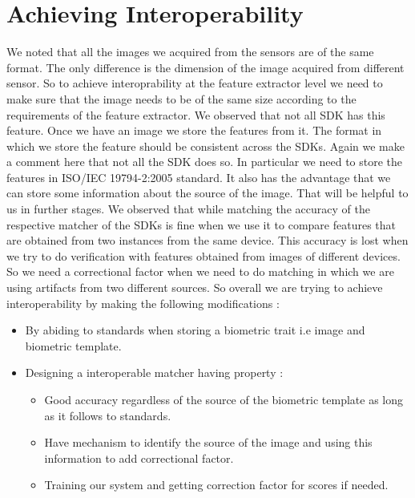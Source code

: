 \documentclass{article}
\begin{document}
\section*{Achieving Interoperability}
We noted that all the images we acquired from the sensors are of the same format. The only difference is the dimension of the image acquired from different sensor. So to achieve interoprability at the feature extractor level we need to make sure that the image needs to be of the same size according to the requirements of the feature extractor. We observed that not all SDK has this feature.
Once we have an image we store the features from it. The format in which we store the feature should be consistent across the SDKs. Again we make a comment  here that not all the SDK does so. In particular we need to store the features in ISO/IEC 19794-2:2005 standard. It also has the advantage that we can store some information about the source of the image. That will be helpful to us in further stages.
We  observed that while matching the accuracy of the respective matcher of the SDKs is fine when we use it to compare features that are obtained from two instances from the same device. This accuracy is lost when we try to do verification with features obtained from images of different devices. So we need a correctional factor when we need to do matching in which we are using artifacts from two different sources.
So overall we are trying to achieve interoperability by making the following modifications :
\begin{itemize}
	\item By abiding to standards when storing a biometric trait i.e image and biometric template.
	\item Designing a interoperable matcher having property :
		\begin{itemize}
			\item Good accuracy regardless of the source of the biometric template as long as it follows to standards.
			\item Have mechanism to identify the source of the image and using this information to add correctional factor.
			\item Training our system and getting correction factor for scores if needed.
		\end{itemize}
\end{itemize}
\end{document}
